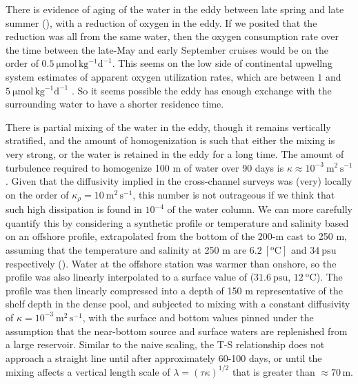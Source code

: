 \documentclass[draft]{agujournal2019}
\begin{document}
There is evidence of aging of the water in the eddy between late spring and late summer (), with a reduction of oxygen in the eddy.  If we posited that the reduction was all from the same water, then the oxygen consumption rate over the time between the late-May and early September cruises would be on the order of $0.5\ \mathrm{\mu mol\, kg^{-1} d^{-1}}$.  This seems on the low side of continental upwellng system estimates of apparent oxygen utilization rates, which are between $1$ and $5\  \mathrm{\mu mol\, kg^{-1} d^{-1}}$ \cite{dortchetal94}.   So it seems possible the eddy has enough exchange with the surrounding water to have a shorter residence time.

There is partial mixing of the water in the eddy, though it remains vertically stratified, and the amount of homogenization is such that either the mixing is very strong, or the water is retained in the eddy for a long time.  The amount of turbulence required to homogenize 100 m of water over 90 days is $\kappa \approx 10^{-3}\ \mathrm{m^2\,s^{-1}}$.  Given that the diffusivity implied in the cross-channel surveys was (very) locally on the order of $\kappa_{\rho} = 10 \ \mathrm{m^2\,s^{-1}}$, this number is not outrageous if we think that such high dissipation is found in $10^{-4}$ of the water column. We can more carefully quantify this by considering a synthetic profile or temperature and salinity based on an offshore profile, extrapolated from the bottom of the 200-m cast to 250 m, assuming that the temperature and salinity at 250 m are $6.2\ \mathrm{[^oC]}$ and $34\ \mathrm{psu}$ respectively ().  Water at the offshore station was warmer than onshore, so the profile was also linearly interpolated to a surface value of ($31.6\ \mathrm{psu}$, $12\ \mathrm{^oC}$).  The profile was then linearly compressed into a depth of 150 m representative of the shelf depth in the dense pool, and subjected to mixing with a constant diffusivity of $\kappa = 10^{-3}\ \mathrm{m^2\,s^{-1}}$, with the surface and bottom values pinned under the assumption that the near-bottom source and surface waters are replenished from a large reservoir.  Similar to the naive scaling, the T-S relationship does not approach a straight line until after approximately 60-100 days, or until the mixing affects a vertical length scale of $\lambda = \left(\tau \kappa\right)^{1/2}$ that is greater than $\approx 70\,\mathrm{m}$.
\end{document}
